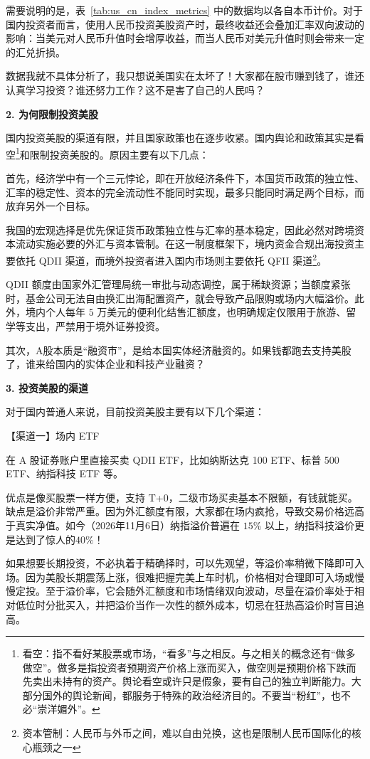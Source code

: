 \documentclass[12pt,openany]{book}
\newcommand{\subhead}[1]{%
    \par\vspace{0.5\baselineskip}%
    \noindent\textbf{#1}\par%
    \vspace{0.5\baselineskip}%
}
\begin{document}
需要说明的是，表~\ref{tab:us_cn_index_metrics} 中的数据均以各自本币计价。对于国内投资者而言，使用人民币投资美股资产时，最终收益还会叠加汇率双向波动的影响：当美元对人民币升值时会增厚收益，而当人民币对美元升值时则会带来一定的汇兑折损。

数据我就不具体分析了，我只想说美国实在太坏了！大家都在股市赚到钱了，谁还认真学习投资？谁还努力工作？这不是害了自己的人民吗？

\subhead{2. 为何限制投资美股}

国内投资美股的渠道有限，并且国家政策也在逐步收紧。国内舆论和政策其实是看空\footnote{看空：指不看好某股票或市场，“看多”与之相反。与之相关的概念还有“做多做空”。做多是指投资者预期资产价格上涨而买入，做空则是预期价格下跌而先卖出未持有的资产。舆论看空或许只是假象，要有自己的独立判断能力。大部分国外的舆论新闻，都服务于特殊的政治经济目的。不要当“粉红”，也不必“崇洋媚外”。}和限制投资美股的。原因主要有以下几点：

首先，经济学中有一个三元悖论，即在开放经济条件下，本国货币政策的独立性、汇率的稳定性、资本的完全流动性不能同时实现，最多只能同时满足两个目标，而放弃另外一个目标。

我国的宏观选择是优先保证货币政策独立性与汇率的基本稳定，因此必然对跨境资本流动实施必要的外汇与资本管制。在这一制度框架下，境内资金合规出海投资主要依托 QDII 渠道，而境外投资者进入国内市场则主要依托 QFII 渠道\footnote{资本管制：人民币与外币之间，难以自由兑换，这也是限制人民币国际化的核心瓶颈之一}。

QDII 额度由国家外汇管理局统一审批与动态调控，属于稀缺资源；当额度紧张时，基金公司无法自由换汇出海配置资产，就会导致产品限购或场内大幅溢价。此外，境内个人每年 $5$ 万美元的便利化结售汇额度，也明确规定仅限用于旅游、留学等支出，严禁用于境外证券投资。

其次，A股本质是“融资市”，是给本国实体经济融资的。如果钱都跑去支持美股了，谁来给国内的实体企业和科技产业融资？

\subhead{3. 投资美股的渠道}

对于国内普通人来说，目前投资美股主要有以下几个渠道：

【渠道一】场内 ETF

在 A 股证券账户里直接买卖 QDII ETF，比如纳斯达克 100 ETF、标普 500 ETF、纳指科技 ETF 等。

优点是像买股票一样方便，支持 T+0，二级市场买卖基本不限额，有钱就能买。缺点是溢价非常严重。因为外汇额度有限，大家都在场内疯抢，导致交易价格远高于真实净值。如今（2026年11月6日）纳指溢价普遍在 $15\%$ 以上，纳指科技溢价更是达到了惊人的$40\%$！

如果想要长期投资，不必执着于精确择时，可以先观望，等溢价率稍微下降即可入场。因为美股长期震荡上涨，很难把握完美上车时机，价格相对合理即可入场或慢慢定投。至于溢价率，它会随外汇额度和市场情绪双向波动，尽量在溢价率处于相对低位时分批买入，并把溢价当作一次性的额外成本，切忌在狂热高溢价时盲目追高。
\end{document}
